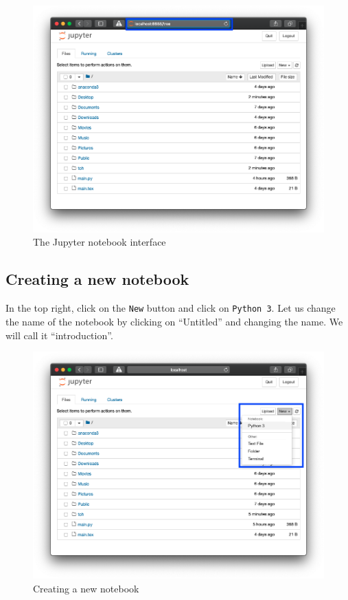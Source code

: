 \begin{figure}[htbp]
\centering
    \includegraphics[width=0.750\linewidth]{assets/the_jupyter_interface/main.png}
    \caption{The Jupyter notebook interface}
\end{figure}

\subsection{Creating a new notebook}
In the top right, click on the \texttt{New} button and click on \texttt{Python 3}.
Let us change the name of the notebook by clicking on “Untitled” and changing
the name. We will call it “introduction”.

\begin{figure}[htbp]
\centering
    \includegraphics[width=0.750\linewidth]{assets/creating_a_new_notebook/main.png}
    \caption{Creating a new notebook}
\end{figure}

